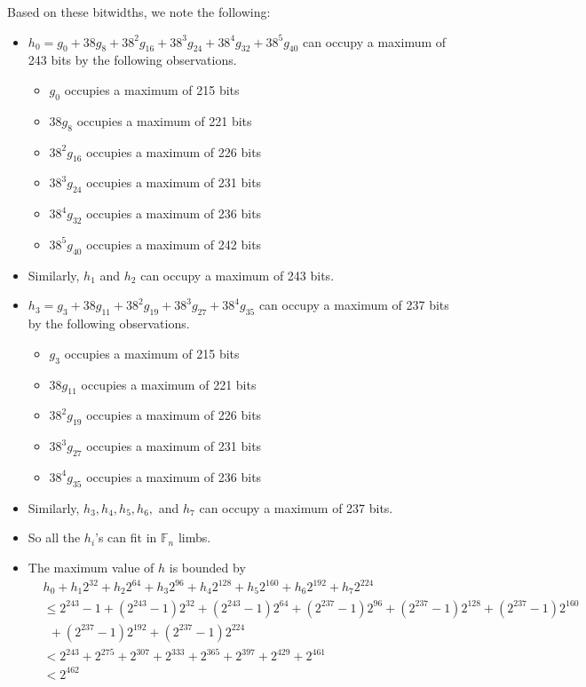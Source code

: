 \documentclass[a4paper, 12pt]{article}
\begin{document}
Based on these bitwidths, we note the following:
\begin{itemize}
  \item $h_0 = g_0 + 38 g_8 + 38^2 g_{16} + 38^3 g_{24} + 38^4 g_{32} + 38^5 g_{40}$ can occupy a maximum of 243 bits by the following observations.
    \begin{itemize}
      \item $g_0$ occupies a maximum of 215 bits
      \item $38g_8$ occupies a maximum of 221 bits
      \item $38^2 g_{16}$ occupies a maximum of 226 bits
      \item $38^3 g_{24}$ occupies a maximum of 231 bits
      \item $38^4 g_{32}$ occupies a maximum of 236 bits
      \item $38^5 g_{40}$ occupies a maximum of 242 bits
    \end{itemize}
  \item Similarly, $h_1$ and $h_2$ can occupy a maximum of 243 bits.
  \item $h_3 = g_3 + 38 g_{11} + 38^2 g_{19} + 38^3 g_{27} + 38^4 g_{35}$ can occupy a maximum of 237 bits by the following observations.
    \begin{itemize}
      \item $g_3$ occupies a maximum of 215 bits
      \item $38g_{11}$ occupies a maximum of 221 bits
      \item $38^2 g_{19}$ occupies a maximum of 226 bits
      \item $38^3 g_{27}$ occupies a maximum of 231 bits
      \item $38^4 g_{35}$ occupies a maximum of 236 bits
    \end{itemize}
  \item Similarly, $h_3, h_4, h_5, h_6,$ and $h_7$ can occupy a maximum of 237 bits.
  \item So all the $h_i$'s can fit in $\mathbb{F}_n$ limbs.
  \item The maximum value of $h$ is bounded by
    \begin{align*}
   &  h_0 + h_1 2^{32} + h_2 2^{64} + h_3 2^{96} + h_4 2^{128} +   h_5 2^{160} + h_6 2^{192}+ h_7 2^{224} \\
   & \le 2^{243}-1 + \left( 2^{243}-1 \right) 2^{32} + \left( 2^{243}-1 \right) 2^{64} + \left( 2^{237}-1 \right) 2^{96} + \left( 2^{237}-1 \right)2^{128} +  \left( 2^{237}-1 \right) 2^{160} \\
   & \ \ + \left( 2^{237}-1 \right) 2^{192}+ \left( 2^{237}-1 \right) 2^{224}\\
   & < 2^{243} + 2^{275} + 2^{307} + 2^{333} + 2^{365} + 2^{397} + 2^{429} + 2^{461}\\
   & < 2^{462}
    \end{align*}
\end{itemize}
\end{document}
